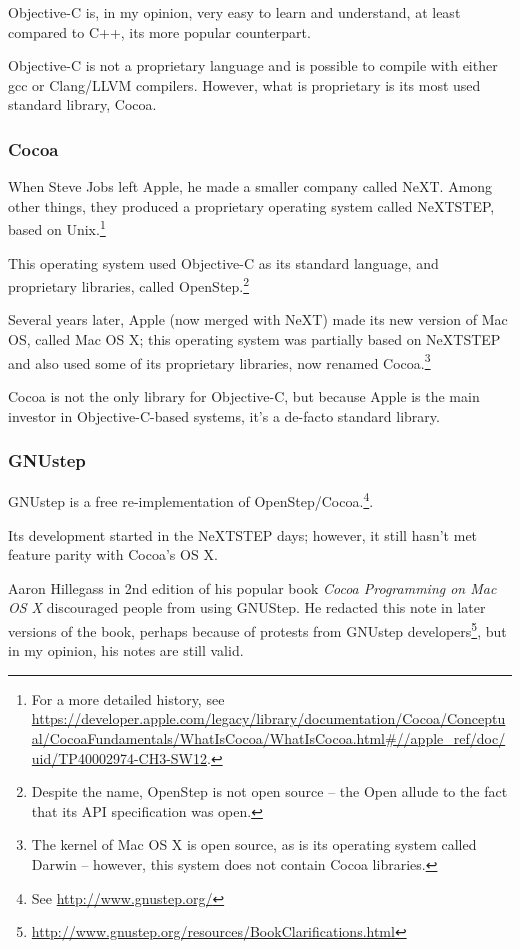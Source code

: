 Objective-C is, in my opinion, very easy to learn and understand, at least compared to C++, its more popular counterpart.

Objective-C is not a proprietary language and is possible to compile with either gcc or Clang/LLVM compilers. However, what is proprietary is its most used standard library, Cocoa.

\subsubsection{Cocoa}
When Steve Jobs left Apple, he made a smaller company called NeXT. Among other things, they produced a proprietary operating system called NeXTSTEP, based on Unix.\footnote{For a more detailed history, see \url{https://developer.apple.com/legacy/library/documentation/Cocoa/Conceptual/CocoaFundamentals/WhatIsCocoa/WhatIsCocoa.html\#//apple\_ref/doc/uid/TP40002974-CH3-SW12}.}

This operating system used Objective-C as its standard language, and proprietary libraries, called OpenStep.\footnote{Despite the name, OpenStep is not open source -- the Open allude to the fact that its API specification was open.}

Several years later, Apple (now merged with NeXT) made its new version of Mac OS, called Mac OS X; this operating system was partially based on NeXTSTEP and also used some of its proprietary libraries, now renamed Cocoa.\footnote{The kernel of Mac OS X is open source, as is its  operating system called Darwin -- however, this system does not contain Cocoa libraries.}

Cocoa is not the only library for Objective-C, but because Apple is the main investor in Objective-C-based systems, it's a de-facto standard library.

\subsubsection{GNUstep}
GNUstep is a free re-implementation of OpenStep/Cocoa.\footnote{See \url{http://www.gnustep.org/}}.

Its development started in the NeXTSTEP days; however, it still hasn't met feature parity with Cocoa's OS X.

Aaron Hillegass in 2nd edition of his popular book \emph{Cocoa Programming on Mac OS X} discouraged people from using GNUStep. He redacted this note in later versions of the book, perhaps because of protests from GNUstep developers\footnote{\url{http://www.gnustep.org/resources/BookClarifications.html}}, but in my opinion, his notes are still valid.

